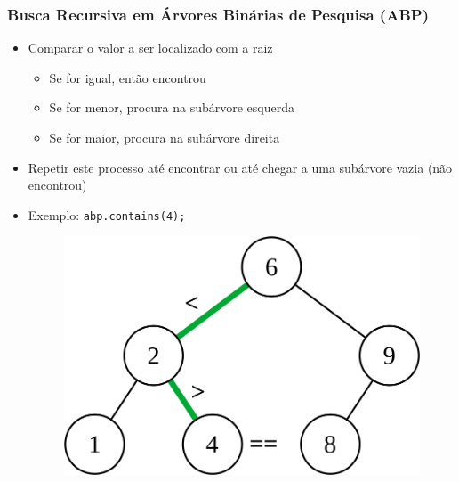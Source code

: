 \documentclass[aspectratio=169]{beamer}
\begin{document}
\begin{frame}\frametitle{Busca Recursiva em Árvores Binárias de Pesquisa (ABP)}
\begin{itemize}
	\item Comparar o valor a ser localizado com a raiz
	\begin{itemize}
		\item Se for igual, então encontrou
		\item Se for menor, procura na subárvore esquerda
		\item Se for maior, procura na subárvore direita
	\end{itemize}
	\item Repetir este processo até encontrar ou até chegar a uma subárvore vazia (não encontrou)
	\item Exemplo: \texttt{abp.contains(4);}
\begin{figure}[h]
	\centering
	\includegraphics[height=0.3\paperheight]{imagens/abp-busca.png}
\end{figure}
\end{itemize}
\end{frame}
\end{document}
